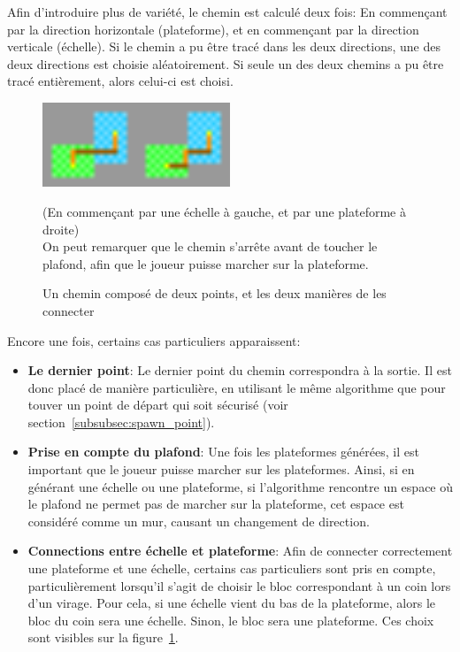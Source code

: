 \documentclass[10pt]{report}
\begin{document}
Afin d'introduire plus de variété, le chemin est calculé deux fois:
En commençant par la direction horizontale (plateforme), et en commençant
par la direction verticale (échelle).
Si le chemin a pu être tracé dans les deux directions, une des deux directions est choisie aléatoirement.
Si seule un des deux chemins a pu être tracé entièrement, alors celui-ci est choisi.

\begin{figure}[H]
  \centering
  \includegraphics[width=0.5\textwidth]{images/two_ways_to_connect}
  \caption{Un chemin composé de deux points, et les deux manières de
  les connecter}
  (En commençant par une échelle à gauche, et par une plateforme à droite)\\
  On peut remarquer que le chemin s'arrête avant de toucher le plafond, 
  afin que le joueur puisse marcher sur la plateforme.
  \label{fig:two_ways_to_connect}
\end{figure}

Encore une fois, certains cas particuliers apparaissent:
\begin{itemize}
  \item \textbf{Le dernier point}: Le dernier point du chemin correspondra à la sortie.
  Il est donc placé de manière particulière, en utilisant le
  même algorithme que pour touver un point de départ qui soit sécurisé (voir section~\ref{subsubsec:spawn_point}).
  \item \textbf{Prise en compte du plafond}: Une fois les plateformes
  générées, il est important que le joueur puisse marcher sur les plateformes.
  Ainsi, si en générant une échelle ou une plateforme, si
  l'algorithme rencontre un espace où le plafond ne permet pas de marcher
  sur la plateforme, cet espace est considéré comme un mur, causant un
  changement de direction.
  \item \textbf{Connections entre échelle et plateforme}: Afin de connecter
  correctement une plateforme et une échelle, certains cas particuliers
  sont pris en compte, particulièrement lorsqu'il s'agit de choisir le bloc
  correspondant à un coin lors d'un virage.
  Pour cela, si une échelle vient du bas de la plateforme, alors le bloc du coin sera une échelle.
  Sinon, le bloc sera une plateforme.
  Ces choix sont visibles sur la figure~\ref{fig:two_ways_to_connect}.
\end{itemize}
\end{document}
